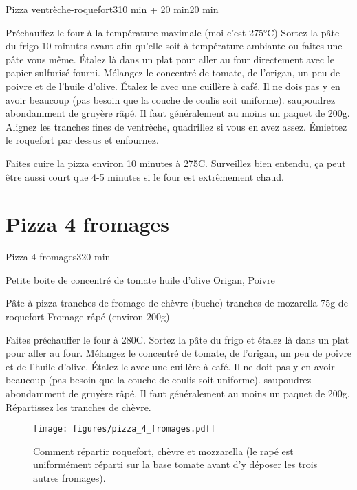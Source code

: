 {\begin{recette}{Pizza ventrèche-roquefort}{3}{10 min + 20 min}{20 min}
\begin{preparation}
\etape Préchauffez le four à la température maximale (moi c'est 275°C)
\etape Sortez la pâte du frigo 10 minutes avant afin qu'elle soit à température ambiante ou faites une pâte vous même.
\etape Étalez là dans un plat pour aller au four directement avec le papier sulfurisé fourni.
\etape Mélangez le concentré de tomate, de l'origan, un peu de poivre et de l'huile d'olive.
\etape Étalez le avec une cuillère à café. Il ne dois pas y en avoir beaucoup (pas besoin que la couche de coulis soit 
uniforme).
\etape saupoudrez abondamment de gruyère râpé. Il faut généralement au moins un paquet de 200g.
\etape Alignez les tranches fines de ventrèche, quadrillez si vous en avez assez. Émiettez le roquefort par dessus et enfournez.
\end{preparation}

\begin{cuisson}
Faites cuire la pizza environ 10 minutes à 275\degres C. Surveillez bien entendu, ça peut être aussi court que 4-5 minutes si 
le four est extrêmement chaud.
\end{cuisson}
\end{recette}

\section{Pizza 4 fromages}
\begin{recette}{Pizza 4 fromages}{3}{}{20 min}

\begin{ingredients}
\ingredient Petite boite de concentré de tomate
\ingredient huile d'olive
\ingredient Origan, Poivre

\ingredient Pâte à pizza
 tranches de fromage de chèvre (buche)
 tranches de mozarella
\ingredient 75g de roquefort
\ingredient Fromage râpé (environ 200g)
\end{ingredients}

\begin{preparation}
\etape Faites préchauffer le four à 280\degres C.
\etape Sortez la pâte du frigo et étalez là dans un plat pour aller au four.
\etape Mélangez le concentré de tomate, de l'origan, un peu de poivre et de l'huile d'olive.
\etape Étalez le avec une cuillère à café. Il ne doit pas y en avoir beaucoup (pas besoin que la couche de coulis soit 
uniforme).
\etape saupoudrez abondamment de gruyère râpé. Il faut généralement au moins un paquet de 200g. 
\etape Répartissez les tranches de chèvre. 
\begin{figure}[htb]
\centering
\texttt{[image: figures/pizza\_4\_fromages.pdf]}
\caption{Comment répartir roquefort, chèvre et mozzarella (le rapé est uniformément réparti sur la base tomate avant d'y déposer les trois autres fromages).}
\end{figure}
\end{preparation}


\end{recette}}
